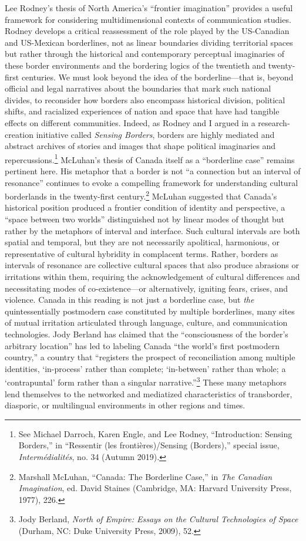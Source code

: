 \documentclass{tufte-handout}
\begin{document}
Lee Rodney's thesis of North America's ``frontier imagination'' provides
a useful framework for considering multidimensional contexts of
communication studies. Rodney develops a critical reassessment of the
role played by the US-Canadian and US-Mexican borderlines, not as linear
boundaries dividing territorial spaces but rather through the historical
and contemporary perceptual imaginaries of these border environments and
the bordering logics of the twentieth and twenty-first centuries. We
must look beyond the idea of the borderline---that is, beyond official
and legal narratives about the boundaries that mark such national
divides, to reconsider how borders also encompass historical division,
political shifts, and racialized experiences of nation and space that
have had tangible effects on different communities. Indeed, as Rodney
and I argued in a research-creation initiative called \emph{Sensing
Borders}, borders are highly mediated and abstract archives of stories
and images that shape political imaginaries and
repercussions.\footnote{See Michael Darroch, Karen Engle, and Lee
  Rodney, ``Introduction: Sensing Borders,'' in ``Ressentir (les
  frontières)/Sensing (Borders),'' special issue,
  \emph{Intermédialités}, no. 34 (Autumn 2019).} McLuhan's thesis of
Canada itself as a ``borderline case'' remains pertinent here. His
metaphor that a border is not ``a connection but an interval of
resonance'' continues to evoke a compelling framework for understanding
cultural borderlands in the twenty-first century.\footnote{Marshall
  McLuhan, ``Canada: The Borderline Case,'' in \emph{The Canadian
  Imagination}, ed. David Staines (Cambridge, MA: Harvard University
  Press, 1977), 226.} McLuhan suggested that Canada's historical
position produced a frontier condition of identity and perspective, a
``space between two worlds'' distinguished not by linear modes of
thought but rather by the metaphors of interval and interface. Such
cultural intervals are both spatial and temporal, but they are not
necessarily apolitical, harmonious, or representative of cultural
hybridity in complacent terms. Rather, borders as intervals of resonance
are collective cultural spaces that also produce abrasions or
irritations within them, requiring the acknowledgement of cultural
differences and necessitating modes of co-existence---or alternatively,
igniting fears, crises, and violence. Canada in this reading is not just
\emph{a} borderline case, but \emph{the} quintessentially postmodern
case constituted by multiple borderlines, many sites of mutual
irritation articulated through language, culture, and communication
technologies. Jody Berland has claimed that the ``consciousness of the
border's arbitrary location'' has led to labeling Canada ``the world's
first postmodern country,'' a country that ``registers the prospect of
reconciliation among multiple identities, `in-process' rather than
complete; `in-between' rather than whole; a `contrapuntal' form rather
than a singular narrative.''\footnote{Jody Berland, \emph{North of
  Empire: Essays on the Cultural Technologies of Space} (Durham, NC:
  Duke University Press, 2009), 52.} These many metaphors lend
themselves to the networked and mediatized characteristics of
transborder, diasporic, or multilingual environments in other regions
and times.
\end{document}
